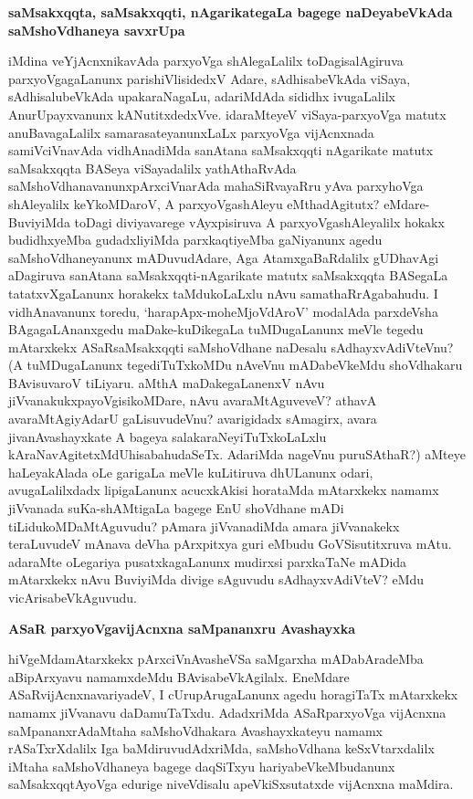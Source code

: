 \noindent
\textbf{saMsakxqqta, saMsakxqqti, nAgarikategaLa bagege naDeyabeVkAda saMshoVdhaneya savxrUpa}\label{page53}

iMdina veYjAcnxnikavAda parxyoVga shAlegaLalilx toDagisalAgiruva parxyoVgagaLanunx parishiVlisidedxV Adare, sAdhisabeVkAda viSaya, sAdhisalubeVkAda upakaraNagaLu, adariMdAda sididhx ivugaLalilx AnurUpayxvanunx kANutitxdedxVve. idaraMteyeV viSaya-parxyoVga matutx anuBavagaLalilx samarasateyanunxLaLx parxyoVga vijAcnxnada samiVciVnavAda vidhAnadiMda sanAtana saMsakxqqti nAgarikate matutx saMsakxqqta BASeya viSayadalilx yathAthaRvAda saMshoVdhanavanunxpArxciVnarAda mahaSiRvayaRru yAva parxyhoVga shAleyalilx keYkoMDaroV, A parxyoVgashAleyu eMthadAgitutx? eMdare-BuviyiMda toDagi diviyavarege vAyxpisiruva A parxyoVgashAleyalilx hokakx budidhxyeMba gudadxliyiMda parxkaqtiyeMba gaNiyanunx agedu saMshoVdhaneyanunx mADuvudAdare, Aga AtamxgaBaRdalilx gUDhavAgi aDagiruva sanAtana saMsakxqqti-nAgarikate matutx saMsakxqqta BASegaLa tatatxvXgaLanunx horakekx taMdukoLaLxlu nAvu samathaRrAgabahudu. I vidhAnavanunx toredu, `harapApx-moheMjoVdAroV' modalAda parxdeVsha BAgagaLAnanxgedu maDake-kuDikegaLa tuMDugaLanunx meVle tegedu mAtarxkekx ASaRsaMsakxqqti saMshoVdhane naDesalu sAdhayxvAdiVteVnu? (A tuMDugaLanunx tegediTuTxkoMDu nAveVnu mADabeVkeMdu shoVdhakaru BAvisuvaroV tiLiyaru. aMthA maDakegaLanenxV nAvu jiVvanakukxpayoVgisikoMDare, nAvu avaraMtAguveveV? athavA avaraMtAgiyAdarU gaLisuvudeVnu? avarigidadx sAmagirx, avara jivanAvashayxkate A bageya salakaraNeyiTuTxkoLaLxlu kAraNavAgitetxMdUhisabahudaSeTx. AdariMda nageVnu puruSAthaR?) aMteye haLeyakAlada oLe garigaLa meVle kuLitiruva dhULanunx odari, avugaLalilxdadx lipigaLanunx acucxkAkisi horataMda mAtarxkekx namamx jiVvanada suKa-shAMtigaLa bagege EnU shoVdhane mADi tiLidukoMDaMtAguvudu? pAmara jiVvanadiMda amara jiVvanakekx teraLuvudeV mAnava deVha pArxpitxya guri eMbudu GoVSisutitxruva mAtu. adaraMte oLegariya pusatxkagaLanunx mudirxsi parxkaTaNe mADida mAtarxkekx nAvu BuviyiMda divige sAguvudu sAdhayxvAdiVteV? eMdu vicArisabeVkAguvudu.


\noindent
\textbf{ASaR parxyoVgavijAcnxna saMpananxru Avashayxka}\label{page54}

hiVgeMdamAtarxkekx pArxciVnAvasheVSa saMgarxha mADabAradeMba aBipArxyavu namamxdeMdu BAvisabeVkAgilalx. EneMdare ASaRvijAcnxnavariyadeV, I cUrupArugaLanunx agedu horagiTaTx mAtarxkekx namamx jiVvanavu daDamuTaTxdu. AdadxriMda ASaRparxyoVga vijAcnxna saMpananxrAdaMtaha saMshoVdhakara Avashayxkateyu namamx rASaTxrXdalilx Iga baMdiruvudAdxriMda, saMshoVdhana keSxVtarxdalilx iMtaha saMshoVdhaneya bagege daqSiTxyu hariyabeVkeMbudanunx saMsakxqqtAyoVga edurige niveVdisalu apeVkiSxsutatxde vijAcnxna maMdira.

